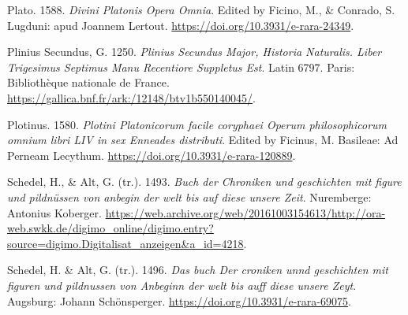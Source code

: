\documentclass[
]{article}
\newlength{\cslhangindent}
\newlength{\cslentryspacingunit} %
\newenvironment{CSLReferences}[2] %
 {%
  \setlength{\parindent}{0pt}
  \ifodd #1
  \let\oldpar\par
  \def\par{\hangindent=\cslhangindent\oldpar}
  \fi
  \setlength{\parskip}{#2\cslentryspacingunit}
 }%
 {}
\begin{document}
\begin{CSLReferences}{1}{0}
\leavevmode{}%
Plato. 1588. \emph{{Divini Platonis Opera Omnia}}. Edited by Ficino, M.,
\& Conrado, S. Lugduni: apud Joannem Lertout.
\url{https://doi.org/10.3931/e-rara-24349}.

\leavevmode{}%
Plinius Secundus, G. 1250. \emph{Plinius Secundus Major, Historia
Naturalis. Liber Trigesimus Septimus Manu Recentiore Suppletus Est}.
Latin 6797. Paris: Bibliothèque nationale de France.
\url{https://gallica.bnf.fr/ark:/12148/btv1b550140045/}.

\leavevmode{}%
Plotinus. 1580. \emph{{Plotini Platonicorum facile coryphaei Operum
philosophicorum omnium libri LIV in sex Enneades distributi}}. Edited by
Ficinus, M. Basileae: Ad Perneam Lecythum.
\url{https://doi.org/10.3931/e-rara-120889}.

\leavevmode{}%
Schedel, H., \& Alt, G. (tr.). 1493. \emph{{Buch der Chroniken und
geschichten mit figure und pildnüssen von anbegin der welt bis auf diese
unsere Zeit}}. Nuremberge: Antonius Koberger.
\url{https://web.archive.org/web/20161003154613/http://ora-web.swkk.de/digimo_online/digimo.entry?source=digimo.Digitalisat_anzeigen\&a_id=4218}.

\leavevmode{}%
Schedel, H. \& Alt, G. (tr.). 1496. \emph{{Das buch Der croniken unnd
geschichten mit figuren und pildnussen von Anbeginn der welt bis auff
diese unsere Zeyt}}. Augsburg: Johann Schönsperger.
\url{https://doi.org/10.3931/e-rara-69075}.

\end{CSLReferences}
\end{document}
